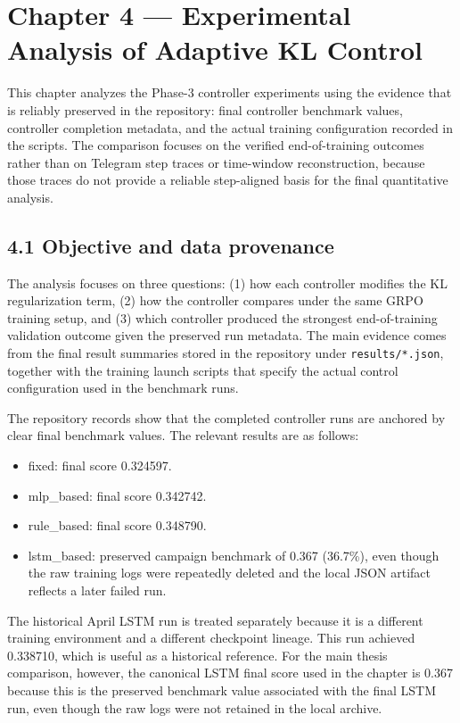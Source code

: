\documentclass{article}
\begin{document}
\section*{Chapter 4 — Experimental Analysis of Adaptive KL Control}

This chapter analyzes the Phase-3 controller experiments using the evidence that is reliably preserved in the repository: final controller benchmark values, controller completion metadata, and the actual training configuration recorded in the scripts. The comparison focuses on the verified end-of-training outcomes rather than on Telegram step traces or time-window reconstruction, because those traces do not provide a reliable step-aligned basis for the final quantitative analysis.

\subsection*{4.1 Objective and data provenance}
The analysis focuses on three questions: (1) how each controller modifies the KL regularization term, (2) how the controller compares under the same GRPO training setup, and (3) which controller produced the strongest end-of-training validation outcome given the preserved run metadata. The main evidence comes from the final result summaries stored in the repository under \texttt{results/*.json}, together with the training launch scripts that specify the actual control configuration used in the benchmark runs.

The repository records show that the completed controller runs are anchored by clear final benchmark values. The relevant results are as follows:
\begin{itemize}
    \item fixed: final score 0.324597.
    \item mlp\_based: final score 0.342742.
    \item rule\_based: final score 0.348790.
    \item lstm\_based: preserved campaign benchmark of 0.367 (36.7\%), even though the raw training logs were repeatedly deleted and the local JSON artifact reflects a later failed run.
\end{itemize}

The historical April LSTM run is treated separately because it is a different training environment and a different checkpoint lineage. This run achieved 0.338710, which is useful as a historical reference. For the main thesis comparison, however, the canonical LSTM final score used in the chapter is 0.367 because this is the preserved benchmark value associated with the final LSTM run, even though the raw logs were not retained in the local archive.
\end{document}
